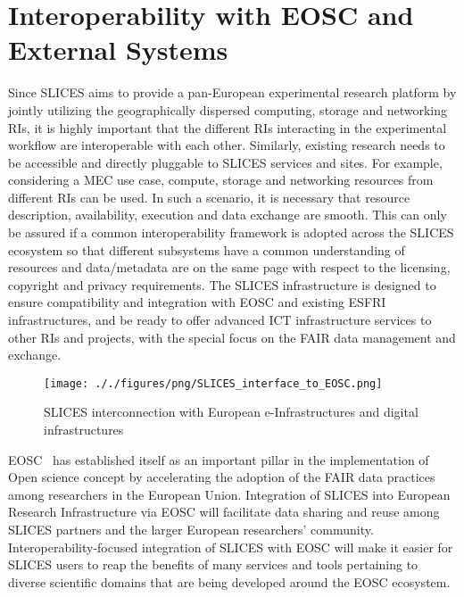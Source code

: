 \section{Interoperability with EOSC and External Systems}
\label{section:Interoperability}

Since SLICES aims to provide a pan-European experimental research platform by jointly utilizing the geographically dispersed computing, storage and networking RIs, it is highly important that the different RIs interacting in the experimental workflow are interoperable with each other. Similarly, existing research needs to be accessible and directly pluggable to SLICES services and sites. For example, considering a MEC use case, compute, storage and networking resources from different RIs can be used. In such a scenario, it is necessary that resource description, availability, execution and data exchange are smooth. This can only be assured if a common interoperability framework is adopted across the SLICES ecosystem so that different subsystems have a common understanding of resources and data/metadata are on the same page with respect to the licensing, copyright and privacy requirements.
The SLICES infrastructure is designed to ensure compatibility and integration with EOSC and existing ESFRI infrastructures, and be ready to offer advanced ICT infrastructure services to other RIs and projects, with the special focus on the FAIR data management and exchange. 

\begin{figure*}[t]
    \centering
    \texttt{[image: ././figures/png/SLICES\_interface\_to\_EOSC.png]}
	\caption{SLICES interconnection with European e-Infrastructures and digital infrastructures}
	\label{fig:SLICES interface to EOSC}
\end{figure*}




EOSC~\cite{eosc} has established itself as an important pillar in the implementation of Open science concept by accelerating the adoption of the FAIR data practices among researchers in the European Union. Integration of SLICES into European Research Infrastructure via EOSC will facilitate data sharing and reuse among SLICES partners and the larger European researchers’ community. Interoperability-focused integration of SLICES with EOSC will make it easier for SLICES users to reap the benefits of many services and tools pertaining to diverse scientific domains that are being developed around the EOSC ecosystem. 

